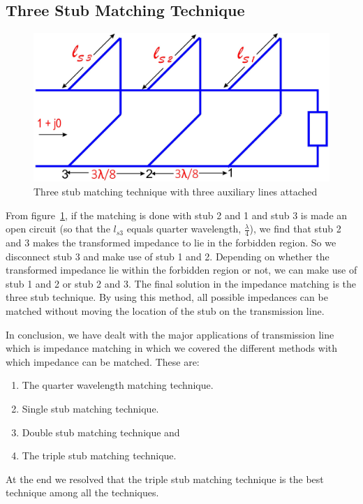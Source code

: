 \subsection{Three Stub Matching Technique}
\begin{figure}[h]
\centering
\includegraphics[width=1\linewidth]{./graphics/fig13}
\caption{Three stub matching technique with three auxiliary lines attached}
\label{fig:fig13}
\end{figure}

From figure~\ref{fig:fig13}, if the matching is done with stub 2 and 1 and stub 3 is made an open circuit (so that the $ l_{s3}$ equals quarter wavelength, $\frac{\lambda}{4}$), we find that stub 2 and 3 makes the transformed impedance to lie in the forbidden region. So we disconnect stub 3 and make use of stub 1 and 2. Depending on whether the transformed impedance lie within the forbidden region or not, we can make use of stub 1 and 2 or stub 2 and 3. The final solution in the impedance matching is the three stub technique. By using this method, all possible impedances can be matched without moving the location of the stub on the transmission line.

In conclusion, we have dealt with the major applications of transmission line which is impedance matching in which we covered the different methods with which impedance can be matched. These are:
\begin{enumerate}
\item The quarter wavelength matching technique.
\item Single stub matching technique.
\item Double stub matching technique and
\item The triple stub matching technique.
\end{enumerate}

At the end we resolved that the triple stub matching technique is the best technique among all the techniques.
